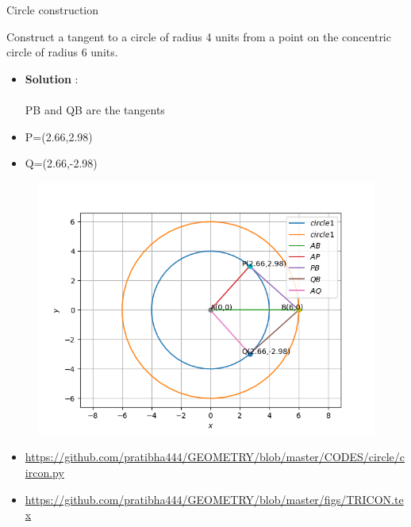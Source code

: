 \begin{frame}{Circle construction}

 Construct a tangent to a circle of radius 4 units
from a point on the concentric circle of radius
6 units.\\
\begin{itemize}
\item\textbf{Solution} :\\
\\  PB and QB are the tangents 
\item P=(2.66,2.98)\\
\item Q=(2.66,-2.98)\\
\end{itemize}

\seti
\end{frame}
\begin{frame}
\begin{figure}
\includegraphics[scale=.4]{./CODES/circle/CIR_CON.png}
\end{figure}
\begin{itemize}
\item \url{https://github.com/pratibha444/GEOMETRY/blob/master/CODES/circle/circon.py}  \\
\item \url{https://github.com/pratibha444/GEOMETRY/blob/master/figs/TRICON.tex}
\end{itemize}
\end{frame}